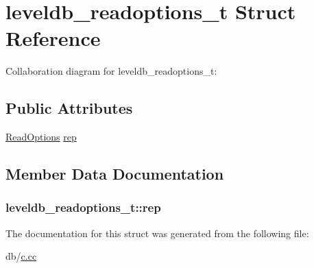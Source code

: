 \hypertarget{structleveldb__readoptions__t}{\section{leveldb\-\_\-readoptions\-\_\-t Struct Reference}
\label{structleveldb__readoptions__t}
}


Collaboration diagram for leveldb\-\_\-readoptions\-\_\-t\-:
\subsection*{Public Attributes}
\begin{DoxyCompactItemize}
\item 
\hyperlink{structleveldb_1_1_read_options}{Read\-Options} \hyperlink{structleveldb__readoptions__t_ad4bc0f881cf2c7a859642cd878dd568c}{rep}
\end{DoxyCompactItemize}


\subsection{Member Data Documentation}
\hypertarget{structleveldb__readoptions__t_ad4bc0f881cf2c7a859642cd878dd568c}{
\subsubsection[{rep}]{ leveldb\-\_\-readoptions\-\_\-t\-::rep}}\label{structleveldb__readoptions__t_ad4bc0f881cf2c7a859642cd878dd568c}


The documentation for this struct was generated from the following file\-:\begin{DoxyCompactItemize}
\item 
db/\hyperlink{c_8cc}{c.\-cc}\end{DoxyCompactItemize}
